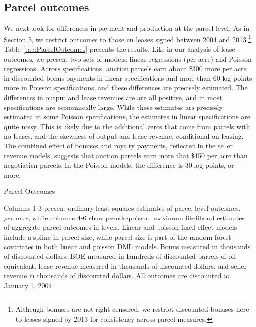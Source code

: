 \documentclass[12pt]{article}
\begin{document}
\subsection{Parcel outcomes \label{sec:ParcelOutcomes}}
We next look for differences in payment and production at the parcel level. As in Section 5, we restrict outcomes to those on leases signed between 2004 and 2013.\footnote{Although bonuses are not right censored, we restrict discounted bonuses here to leases signed by 2013 for consistency across parcel measures.} Table \ref{tab:ParcelOutcomes} presents the results. Like in our analysis of lease outcomes, we present two sets of models: linear regressions (per acre) and Poisson regressions. Across specifications, auction parcels earn about \$300 more per acre in discounted bonus payments in linear specifications and more than 60 log points more in Poisson specifications, and these differences are precisely estimated.  The differences in output and lease revenues are are all positive, and in most specifications are economically large.  While these estimates are precisely estimated in some Poisson specifications, the estimates in linear specifications are quite noisy. This is likely due to the additional zeros that come from parcels with no leases, and the skewness of output and lease revenue, conditional on leasing.  The combined effect of bonuses and royalty payments, reflected in the seller revenue models, suggests that auction parcels earn more that \$450 per acre than negotiation parcels.  In the Poisson models, the difference is 30 log points, or more. 

\addtolength{\tabcolsep}{6pt}
\begin{table}[H]
\begin{center}
\begin{threeparttable}
	\caption{Parcel Outcomes}
	\label{tab:ParcelOutcomes}
 	\small
   	            
    \footnotesize
    \begin{tablenotes}
    	\item Columns 1-3 present ordinary least squares estimates of parcel level outcomes, \textit{per acre}, while columns 4-6 show pseudo-poisson maximum likelihood estimates of aggregate parcel outcomes in levels.  Linear and poisson fixed effect models include a spline in parcel size, while parcel size is part of the random forest covariates in both linear and poisson DML models.  Bonus measured in thousands of discounted dollars, BOE measured in hundreds of discounted barrels of oil equivalent, lease revenue measured in thousands of discounted dollars, and seller revenue in thousands of discounted dollars.  All outcomes are discounted to January 1, 2004.
    \end{tablenotes}
\end{threeparttable}
\end{center}
\end{table}
\end{document}
